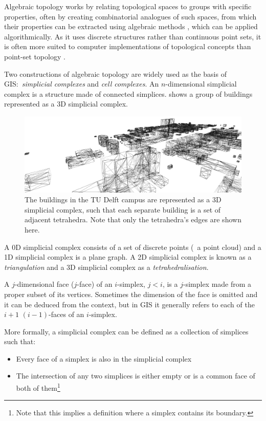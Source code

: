 Algebraic topology works by relating topological spaces to groups with specific properties, often by creating combinatorial analogues of such spaces, from which their properties can be extracted using algebraic methods \citep{Henle94}, which can be applied algorithmically.
As it uses discrete structures rather than continuous point sets, it is often more suited to computer implementations of topological concepts than point-set topology \citep[\S{}3.3.5]{Worboys04}.

Two constructions of algebraic topology are widely used as the basis of GIS:\ \emph{simplicial complexes} and \emph{cell complexes}.
An $n$-dimensional simplicial complex is a structure made of connected simplices.
 shows a group of buildings represented as a 3D simplicial complex.
\begin{figure}[tbp]
\centering
\includegraphics[width=\linewidth]{figs/simplicescampus}
\caption[The TU Delft campus as a 3D simplicial complex]{The buildings in the TU Delft campus are represented as a 3D simplicial complex, such that each separate building is a set of adjacent tetrahedra. Note that only the tetrahedra's edges are shown here.}
\label{fig:simplicescampus}
\end{figure}
A 0D simplicial complex consists of a set of discrete points (\ie\ a point cloud) and a 1D simplicial complex is a plane graph.
A 2D simplicial complex is known as a \emph{triangulation} and a 3D simplicial complex as a \emph{tetrahedralisation}.

A $j$-dimensional face ($j$-face) of an $i$-simplex, $j < i$, is a $j$-simplex made from a proper subset of its vertices.
Sometimes the dimension of the face is omitted and it can be deduced from the context, but in GIS it generally refers to each of the $i+1$ $(i-1)$-faces of an $i$-simplex.

More formally, a simplicial complex can be defined as a collection of simplices such that:
\begin{itemize}
\item
Every face of a simplex is also in the simplicial complex
\item
The intersection of any two simplices is either empty or is a common face of both of them\footnote{Note that this implies a definition where a simplex contains its boundary.}
\end{itemize}

